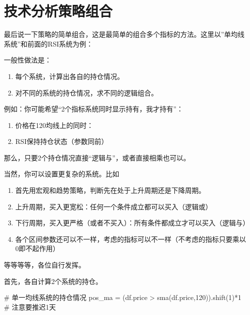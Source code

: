 \documentclass[
  letterpaper,
  DIV=11,
  numbers=noendperiod]{scrreprt}
\newenvironment{Shaded}{\begin{snugshade}}{\end{snugshade}}
\newcommand{\CommentTok}[1]{\textcolor[rgb]{0.37,0.37,0.37}{#1}}
\newcommand{\DecValTok}[1]{\textcolor[rgb]{0.68,0.00,0.00}{#1}}
\newcommand{\NormalTok}[1]{\textcolor[rgb]{0.00,0.23,0.31}{#1}}
\newcommand{\OperatorTok}[1]{\textcolor[rgb]{0.37,0.37,0.37}{#1}}
\providecommand{\tightlist}{%
  \setlength{\itemsep}{0pt}\setlength{\parskip}{0pt}}\usepackage{longtable,booktabs,array}
\begin{document}
\hypertarget{ux6280ux672fux5206ux6790ux7b56ux7565ux7ec4ux5408}{%
\section{技术分析策略组合}\label{ux6280ux672fux5206ux6790ux7b56ux7565ux7ec4ux5408}}

最后说一下策略的简单组合，这是最简单的组合多个指标的方法。这里以''单均线系统''和前面的RSI系统为例：

一般性做法是：

\begin{enumerate}
\def\labelenumi{\arabic{enumi}.}
\tightlist
\item
  每个系统，计算出各自的持仓情况。
\item
  对不同的系统的持仓情况，求不同的逻辑组合。
\end{enumerate}

例如：你可能希望``2个指标系统同时显示持有，我才持有''：

\begin{enumerate}
\def\labelenumi{\arabic{enumi}.}
\tightlist
\item
  价格在120均线上的同时：
\item
  RSI保持持仓状态（参数同前）
\end{enumerate}

那么，只要2个持仓情况直接``逻辑与''，或者直接相乘也可以。

当然，你可以设置更复杂的系统。比如

\begin{enumerate}
\def\labelenumi{\arabic{enumi}.}
\tightlist
\item
  首先用宏观和趋势策略，判断先在处于上升周期还是下降周期。
\item
  上升周期，买入更宽松：任何一个条件成立都可以买入（逻辑或）
\item
  下行周期，买入更严格（或者不买入）：所有条件都成立才可以买入（逻辑与）
\item
  各个区间参数还可以不一样，考虑的指标可以不一样（不考虑的指标只要乘以0即不起作用）
\end{enumerate}

等等等等，各位自行发挥。

首先，各自计算2个系统的持仓。

\begin{Shaded}
\begin{Highlighting}[]
\CommentTok{\# 单一均线系统的持仓情况}
\NormalTok{pos\_ma }\OperatorTok{=}\NormalTok{ (df.price }\OperatorTok{\textgreater{}}\NormalTok{ sma(df.price,}\DecValTok{120}\NormalTok{)).shift(}\DecValTok{1}\NormalTok{)}\OperatorTok{*}\DecValTok{1} \CommentTok{\# 注意要推迟1天}
\end{Highlighting}
\end{Shaded}
\end{document}
